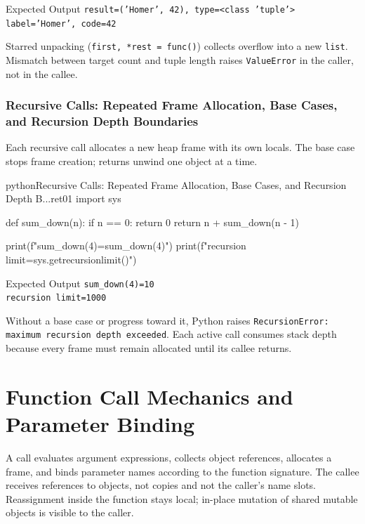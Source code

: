\documentclass[a4paper,twoside]{report}
\begin{document}
\begin{iobox}{Expected Output}
\texttt{result=('Homer', 42), type=<class 'tuple'>} \\
\texttt{label='Homer', code=42} \\
\end{iobox}




Starred unpacking (\texttt{first, *rest = func()}) collects overflow into a new \texttt{list}. Mismatch between target count and tuple length raises \texttt{ValueError} in the caller, not in the callee.

\subsubsection{Recursive Calls: Repeated Frame Allocation, Base Cases, and Recursion Depth Boundaries}

Each recursive call allocates a new heap frame with its own locals. The base case stops frame creation; returns unwind one object at a time.

\begin{codebox}[]{python}{Recursive Calls: Repeated Frame Allocation, Base Cases, and Recursion Depth B...}{ret01}
import sys

def sum_down(n):
    if n == 0:
        return 0
    return n + sum_down(n - 1)

print(f"sum_down(4)={sum_down(4)}")
print(f"recursion limit={sys.getrecursionlimit()}")
\end{codebox}


\begin{iobox}{Expected Output}
\texttt{sum\_down(4)=10} \\
\texttt{recursion limit=1000} \\
\end{iobox}




Without a base case or progress toward it, Python raises \texttt{RecursionError: maximum recursion depth exceeded}. Each active call consumes stack depth because every frame must remain allocated until its callee returns.


\section{Function Call Mechanics and Parameter Binding}

A call evaluates argument expressions, collects object references, allocates a frame, and binds parameter names according to the function signature. The callee receives references to objects, not copies and not the caller's name slots. Reassignment inside the function stays local; in-place mutation of shared mutable objects is visible to the caller.
\end{document}
